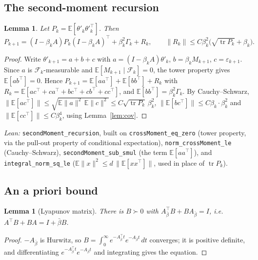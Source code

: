 \documentclass[11pt]{article}
\newtheorem{lemma}[theorem]{Lemma}
\theoremstyle{definition}
\theoremstyle{remark}
\newcommand{\E}{\mathbb{E}}
\newcommand{\F}{\mathcal{F}}
\DeclareMathOperator{\tr}{tr}
\begin{document}
\subsection{The second-moment recursion}

\begin{lemma}\label{lem:rec}
Let $P_k = \E[\theta'_k\theta'^\top_k]$. Then
\[
  P_{k+1} = (I - \beta_kA)P_k(I - \beta_kA)^\top + \beta_k^2\Gamma_k + R_k,
  \qquad
  \|R_k\| \le C\beta_k^2\big(\sqrt{\tr P_k} + \beta_k\big).
\]
\end{lemma}
\begin{proof}
Write $\theta'_{k+1} = a + b + c$ with $a = (I - \beta_kA)\theta'_k$, $b = \beta_kM_{k+1}$,
$c = \varepsilon_{k+1}$. Since $a$ is $\F_k$-measurable and $\E[M_{k+1}\mid\F_k] = 0$,
the tower property gives $\E[ab^\top] = 0$. Hence
$P_{k+1} = \E[aa^\top] + \E[bb^\top] + R_k$ with
$R_k = \E[ac^\top + ca^\top + bc^\top + cb^\top + cc^\top]$, and $\E[bb^\top] = \beta_k^2\Gamma_k$.
By Cauchy--Schwarz, $\|\E[ac^\top]\| \le \sqrt{\E\|a\|^2\,\E\|c\|^2} \le C\sqrt{\tr P_k}\,\beta_k^2$,
$\|\E[bc^\top]\| \le C\beta_k\cdot\beta_k^2$ and $\|\E[cc^\top]\| \le C\beta_k^4$, using
Lemma~\ref{lem:cov}.
\end{proof}
\noindent\emph{Lean:} \texttt{secondMoment\_recursion}, built on \texttt{crossMoment\_eq\_zero}
(tower property, via the pull-out property of conditional expectation),
\texttt{norm\_crossMoment\_le} (Cauchy--Schwarz), \texttt{secondMoment\_sub\_smul} (the term
$\E[aa^\top]$), and \texttt{integral\_norm\_sq\_le} ($\E\|x\|^2 \le d\,\|\E[xx^\top]\|$, used in
place of $\tr P_k$).

\subsection{An a priori bound}

\begin{lemma}[Lyapunov matrix]\label{lem:B}
There is $B \succ 0$ with $A_{\bar\beta}^\top B + BA_{\bar\beta} = I$, i.e.\
$A^\top B + BA = I + \bar\beta B$.
\end{lemma}
\begin{proof}
$-A_{\bar\beta}$ is Hurwitz, so $B = \int_0^\infty e^{-A_{\bar\beta}^\top t}e^{-A_{\bar\beta}t}\,dt$
converges; it is positive definite, and differentiating
$e^{-A_{\bar\beta}^\top t}e^{-A_{\bar\beta}t}$ and integrating gives the equation.
\end{proof}
\end{document}
